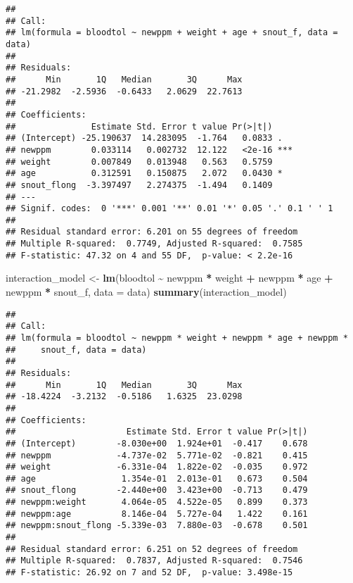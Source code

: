 \documentclass[
]{article}
\newenvironment{Shaded}{\begin{snugshade}}{\end{snugshade}}
\newcommand{\AttributeTok}[1]{\textcolor[rgb]{0.13,0.29,0.53}{#1}}
\newcommand{\FunctionTok}[1]{\textcolor[rgb]{0.13,0.29,0.53}{\textbf{#1}}}
\newcommand{\NormalTok}[1]{#1}
\newcommand{\OtherTok}[1]{\textcolor[rgb]{0.56,0.35,0.01}{#1}}
\newcommand{\SpecialCharTok}[1]{\textcolor[rgb]{0.81,0.36,0.00}{\textbf{#1}}}
\begin{document}
\begin{verbatim}
## 
## Call:
## lm(formula = bloodtol ~ newppm + weight + age + snout_f, data = data)
## 
## Residuals:
##      Min       1Q   Median       3Q      Max 
## -21.2982  -2.5936  -0.6433   2.0629  22.7613 
## 
## Coefficients:
##               Estimate Std. Error t value Pr(>|t|)    
## (Intercept) -25.190637  14.283095  -1.764   0.0833 .  
## newppm        0.033114   0.002732  12.122   <2e-16 ***
## weight        0.007849   0.013948   0.563   0.5759    
## age           0.312591   0.150875   2.072   0.0430 *  
## snout_flong  -3.397497   2.274375  -1.494   0.1409    
## ---
## Signif. codes:  0 '***' 0.001 '**' 0.01 '*' 0.05 '.' 0.1 ' ' 1
## 
## Residual standard error: 6.201 on 55 degrees of freedom
## Multiple R-squared:  0.7749, Adjusted R-squared:  0.7585 
## F-statistic: 47.32 on 4 and 55 DF,  p-value: < 2.2e-16
\end{verbatim}

\begin{Shaded}
\begin{Highlighting}[]
\NormalTok{interaction\_model }\OtherTok{\textless{}{-}} \FunctionTok{lm}\NormalTok{(bloodtol }\SpecialCharTok{\textasciitilde{}}\NormalTok{ newppm }\SpecialCharTok{*}\NormalTok{ weight }\SpecialCharTok{+}\NormalTok{ newppm }\SpecialCharTok{*}\NormalTok{ age }\SpecialCharTok{+}\NormalTok{ newppm }\SpecialCharTok{*}\NormalTok{ snout\_f, }\AttributeTok{data =}\NormalTok{ data)}
\FunctionTok{summary}\NormalTok{(interaction\_model)}
\end{Highlighting}
\end{Shaded}

\begin{verbatim}
## 
## Call:
## lm(formula = bloodtol ~ newppm * weight + newppm * age + newppm * 
##     snout_f, data = data)
## 
## Residuals:
##      Min       1Q   Median       3Q      Max 
## -18.4224  -3.2132  -0.5186   1.6325  23.0298 
## 
## Coefficients:
##                      Estimate Std. Error t value Pr(>|t|)
## (Intercept)        -8.030e+00  1.924e+01  -0.417    0.678
## newppm             -4.737e-02  5.771e-02  -0.821    0.415
## weight             -6.331e-04  1.822e-02  -0.035    0.972
## age                 1.354e-01  2.013e-01   0.673    0.504
## snout_flong        -2.440e+00  3.423e+00  -0.713    0.479
## newppm:weight       4.064e-05  4.522e-05   0.899    0.373
## newppm:age          8.146e-04  5.727e-04   1.422    0.161
## newppm:snout_flong -5.339e-03  7.880e-03  -0.678    0.501
## 
## Residual standard error: 6.251 on 52 degrees of freedom
## Multiple R-squared:  0.7837, Adjusted R-squared:  0.7546 
## F-statistic: 26.92 on 7 and 52 DF,  p-value: 3.498e-15
\end{verbatim}
\end{document}
